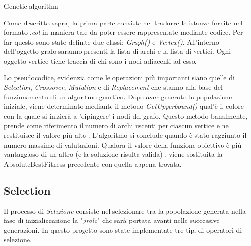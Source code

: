 \documentclass[12pt]{article}
\begin{document}
\begin{enumerate}
\begin{algorithm}
\caption{Genetic algorithm}\label{alg:cap}
\begin{algorithmic} 

            \EndIf
\end{algorithmic}
\end{algorithm}



\noindent Come descritto  sopra, la prima parte consiste nel tradurre le istanze fornite nel formato \textit{.col} in maniera tale da poter essere rappresentate mediante codice. Per far questo sono state definite due classi: \textit{Graph()} e \textit{Vertex()}. All'interno dell'oggetto grafo saranno presenti la lista di archi e la lista di vertici. Ogni oggetto vertice tiene traccia di chi sono i nodi adiacenti ad esso.


\noindent Lo pseudocodice, evidenzia come le operazioni più importanti siano quelle di \textit{Selection}, \textit{Crossover}, \textit{Mutation} e di \textit{Replacement} che stanno alla base del funzionamento di un algoritmo genetico. Dopo aver generato la popolazione iniziale, viene determinato mediante il metodo \textit{GetUpperbound()} qual'è il colore con la quale si inizierà a 'dipingere' i nodi del grafo. Questo metodo banalmente, prende come riferimento il numero di archi uscenti per ciascun vertice e ne restituisce il valore più alto . L'algoritmo si conclude quando è stato raggiunto il numero massimo di valutazioni. Qualora  il valore della funzione obiettivo  è più vantaggioso di un altro (e la soluzione risulta valida) , viene sostituita la AbsoluteBestFitness precedente con quella appena trovata.

\subsection{Selection}
Il processo di \textit{Selezione} consiste nel selezionare tra la popolazione generata nella fase di inizializzazione la "\textit{prole}" che sarà portata avanti nelle successive generazioni. In questo progetto sono state implementate tre tipi di operatori di selezione.


\end{enumerate}
\end{document}

